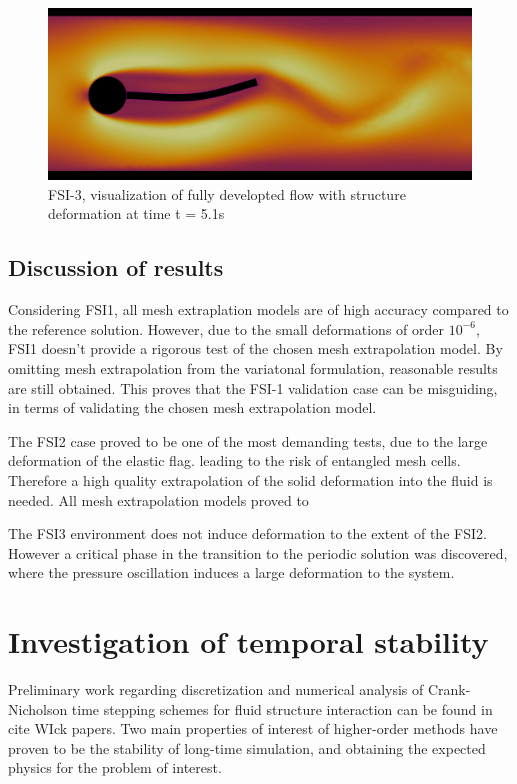 \begin{figure}[h!]
  \centering
    \includegraphics[scale=0.2]{./Fig/fsi3flow.png}
      \caption{FSI-3, visualization of fully developted flow with structure deformation at time t = 5.1s}
\end{figure}

\newpage
\subsection{Discussion of results}
Considering FSI1, all mesh extraplation models are of high accuracy compared to the reference solution.  However, due to the small deformations of order $10^{-6}$, FSI1 doesn't provide a rigorous test of the chosen mesh extrapolation model. By omitting mesh extrapolation from the variatonal formulation,  reasonable results are still obtained. This proves that the FSI-1 validation case can be misguiding, in terms of validating the chosen mesh extrapolation model. 

The FSI2 case proved to be one of the most demanding tests, due to the large deformation of the elastic flag. leading to the risk of entangled mesh cells. Therefore a high quality extrapolation of the solid deformation into the fluid is needed. All mesh extrapolation models proved to

The FSI3 environment does not induce deformation to the extent of the FSI2. However a critical phase in the transition to the periodic solution was discovered, where the pressure oscillation induces a large deformation to the system.

\section{Investigation of temporal stability}

Preliminary work regarding discretization and numerical analysis of Crank-Nicholson time stepping schemes for fluid structure interaction can be found in cite WIck papers. Two main properties of interest of higher-order methods have proven to be the stability of long-time simulation, and obtaining the expected physics for the problem of interest.

